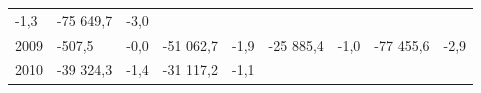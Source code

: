 \begin{longtable}[]{@{}lllllllll@{}}
\begin{minipage}[t]{0.06\columnwidth}
-1,3\strut
\end{minipage} & \begin{minipage}[t]{0.09\columnwidth}\raggedright
-75 649,7\strut
\end{minipage} & \begin{minipage}[t]{0.06\columnwidth}\raggedright
-3,0\strut
\end{minipage}\tabularnewline
\begin{minipage}[t]{0.05\columnwidth}\raggedright
2009\strut
\end{minipage} & \begin{minipage}[t]{0.10\columnwidth}\raggedright
-507,5\strut
\end{minipage} & \begin{minipage}[t]{0.06\columnwidth}\raggedright
-0,0\strut
\end{minipage} & \begin{minipage}[t]{0.16\columnwidth}\raggedright
-51 062,7\strut
\end{minipage} & \begin{minipage}[t]{0.06\columnwidth}\raggedright
-1,9\strut
\end{minipage} & \begin{minipage}[t]{0.12\columnwidth}\raggedright
-25 885,4\strut
\end{minipage} & \begin{minipage}[t]{0.06\columnwidth}\raggedright
-1,0\strut
\end{minipage} & \begin{minipage}[t]{0.09\columnwidth}\raggedright
-77 455,6\strut
\end{minipage} & \begin{minipage}[t]{0.06\columnwidth}\raggedright
-2,9\strut
\end{minipage}\tabularnewline
\begin{minipage}[t]{0.05\columnwidth}\raggedright
2010\strut
\end{minipage} & \begin{minipage}[t]{0.10\columnwidth}\raggedright
-39 324,3\strut
\end{minipage} & \begin{minipage}[t]{0.06\columnwidth}\raggedright
-1,4\strut
\end{minipage} & \begin{minipage}[t]{0.16\columnwidth}\raggedright
-31 117,2\strut
\end{minipage} & \begin{minipage}[t]{0.06\columnwidth}\raggedright
-1,1\strut
\end{minipage} & \begin{minipage}[t]{0.12\columnwidth}\raggedright

\end{minipage}
\end{longtable}
